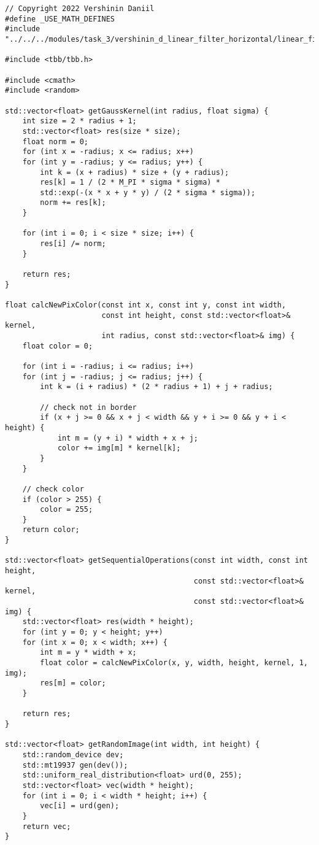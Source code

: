 \documentclass{report}
\begin{document}
\begin{lstlisting}
// Copyright 2022 Vershinin Daniil
#define _USE_MATH_DEFINES
#include "../../../modules/task_3/vershinin_d_linear_filter_horizontal/linear_filter_horizontal.h"

#include <tbb/tbb.h>

#include <cmath>
#include <random>

std::vector<float> getGaussKernel(int radius, float sigma) {
	int size = 2 * radius + 1;
	std::vector<float> res(size * size);
	float norm = 0;
	for (int x = -radius; x <= radius; x++)
	for (int y = -radius; y <= radius; y++) {
		int k = (x + radius) * size + (y + radius);
		res[k] = 1 / (2 * M_PI * sigma * sigma) *
		std::exp(-(x * x + y * y) / (2 * sigma * sigma));
		norm += res[k];
	}
	
	for (int i = 0; i < size * size; i++) {
		res[i] /= norm;
	}
	
	return res;
}

float calcNewPixColor(const int x, const int y, const int width,
                      const int height, const std::vector<float>& kernel,
                      int radius, const std::vector<float>& img) {
	float color = 0;
	
	for (int i = -radius; i <= radius; i++)
	for (int j = -radius; j <= radius; j++) {
		int k = (i + radius) * (2 * radius + 1) + j + radius;
		
		// check not in border
		if (x + j >= 0 && x + j < width && y + i >= 0 && y + i < height) {
			int m = (y + i) * width + x + j;
			color += img[m] * kernel[k];
		}
	}
	
	// check color
	if (color > 255) {
		color = 255;
	}
	return color;
}

std::vector<float> getSequentialOperations(const int width, const int height,
                                           const std::vector<float>& kernel,
                                           const std::vector<float>& img) {
	std::vector<float> res(width * height);
	for (int y = 0; y < height; y++)
	for (int x = 0; x < width; x++) {
		int m = y * width + x;
		float color = calcNewPixColor(x, y, width, height, kernel, 1, img);
		res[m] = color;
	}
	
	return res;
}

std::vector<float> getRandomImage(int width, int height) {
	std::random_device dev;
	std::mt19937 gen(dev());
	std::uniform_real_distribution<float> urd(0, 255);
	std::vector<float> vec(width * height);
	for (int i = 0; i < width * height; i++) {
		vec[i] = urd(gen);
	}
	return vec;
}


\end{lstlisting}
\end{document}
